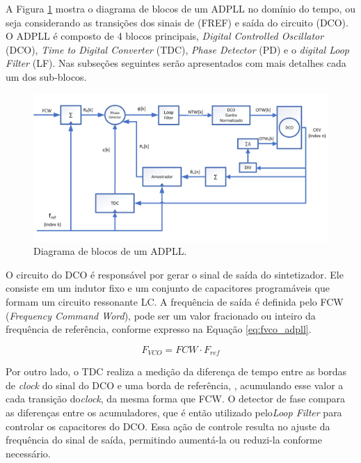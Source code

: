 A Figura \ref{fig:adpll_block_diagram} mostra o diagrama de blocos de um ADPLL no domínio do tempo, ou seja considerando as transições dos sinais de (FREF) e saída do circuito (DCO). O ADPLL é composto de 4 blocos principais,  \textit{Digital Controlled Oscillator} (DCO), \textit{Time to Digital Converter} (TDC), \textit{Phase Detector} (PD) e o \textit{ digital Loop Filter} (LF). Nas subseções seguintes serão apresentados com mais detalhes cada um dos sub-blocos. 

\begin{figure}[h!]
	\caption{Diagrama de blocos de um ADPLL.}
	\begin{center}
		\includegraphics[scale=1]{img/blocos_ADPLL.png}
	\end{center}
	\label{fig:adpll_block_diagram}
\end{figure}

O circuito do DCO é responsável por gerar o sinal de saída do sintetizador. Ele consiste em um indutor fixo e um conjunto de capacitores programáveis que formam um circuito ressonante LC. A frequência de saída é definida pelo FCW (\textit{Frequency Command Word}), pode ser um valor fracionado ou inteiro da frequência de referência, conforme expresso na Equação \ref{eq:fvco_adpll}.

\begin{equation}
	F_{VCO} = FCW \cdot F_{ref}
	\label{eq:fvco_adpll}
\end{equation}

Por outro lado, o TDC realiza a medição da diferença de tempo entre as bordas de \textit{clock} do sinal do DCO e uma borda de referência, , acumulando esse valor a cada transição do\textit{clock}, da mesma forma que FCW. O detector de fase compara as diferenças entre os acumuladores, que é então utilizado pelo\textit{Loop Filter} para controlar os capacitores do DCO. Essa ação de controle resulta no ajuste da frequência do sinal de saída, permitindo aumentá-la ou reduzi-la conforme necessário.




